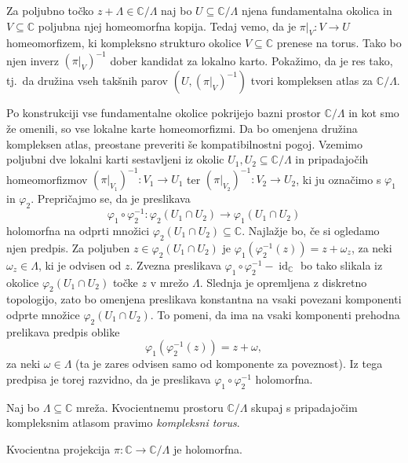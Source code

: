 \documentclass[mat1]{fmfdelo}
\numberwithin{equation}{section}
\newcommand{\C}{\mathbb C}
\newcommand{\om}{\omega}
\newcommand{\inv}{^{-1}}
\newcommand{\torus}{\C/\Lambda}
\newcommand{\tj}{tj.\ }
\DeclareMathOperator{\id}{id}
\theoremstyle{definition}
\begin{document}
\begin{dokaz}
    Za poljubno točko $z + \Lambda \in \torus$ naj bo $U \subseteq \torus$ njena fundamentalna okolica in $V \subseteq \C$ poljubna njej homeomorfna kopija. Tedaj vemo, da je $\pi|_V : V \to U$ homeomorfizem, ki kompleksno strukturo okolice $V \subseteq \C$ prenese na torus. Tako bo njen inverz $(\pi|_V)\inv$ dober kandidat za lokalno karto. Pokažimo, da je res tako, \tj da družina vseh takšnih parov $(U, (\pi|_V)\inv)$ tvori kompleksen atlas za $\torus$. 

    Po konstrukciji vse fundamentalne okolice pokrijejo bazni prostor $\torus$ in kot smo že omenili, so vse lokalne karte homeomorfizmi. Da bo omenjena družina kompleksen atlas, preostane preveriti še kompatibilnostni pogoj. Vzemimo poljubni dve lokalni karti sestavljeni iz okolic $U_1, U_2 \subseteq \torus$ in pripadajočih homeomorfizmov $(\pi|_{V_1})\inv : V_1 \to U_1$ ter $(\pi|_{V_2})\inv : V_2 \to U_2$, ki ju označimo s $\varphi_1$ in $\varphi_2$. Prepričajmo se, da je preslikava 
    \[
        \varphi_1 \circ \varphi_2\inv : \varphi_2(U_1 \cap U_2) \longrightarrow  \varphi_1(U_1 \cap U_2)
    \]
    holomorfna na odprti množici $\varphi_2(U_1 \cap U_2) \subseteq \C$. Najlažje bo, če si ogledamo njen predpis. Za poljuben $z \in \varphi_2(U_1 \cap U_2)$ je $\varphi_1(\varphi_2\inv(z)) = z + \om_z$, za neki $\om_z \in \Lambda$, ki je odvisen od $z$. Zvezna preslikava $\varphi_1 \circ \varphi_2\inv - \id_\C$ bo tako slikala iz okolice $\varphi_2(U_1 \cap U_2)$ točke $z$ v mrežo $\Lambda$. Slednja je opremljena z diskretno topologijo, zato bo omenjena preslikava konstantna na vsaki povezani komponenti odprte množice $\varphi_2(U_1 \cap U_2)$. To pomeni, da ima na vsaki komponenti prehodna prelikava predpis oblike 
    \[
        \varphi_1(\varphi_2\inv(z)) = z + \om,
    \]
    za neki $\om \in \Lambda$ (ta je zares odvisen samo od komponente za poveznost). Iz tega predpisa je torej razvidno, da je preslikava $\varphi_1 \circ \varphi_2\inv$ holomorfna. 
\end{dokaz}

\begin{definicija}
    Naj bo $\Lambda \subseteq \C$ mreža. Kvocientnemu prostoru $\torus$ skupaj s pripadajočim kompleksnim atlasom pravimo \emph{kompleksni torus}.  
\end{definicija}

\begin{lema}
    Kvocientna projekcija $\pi : \C \to \torus$ je holomorfna. 
\end{lema}
\end{document}
